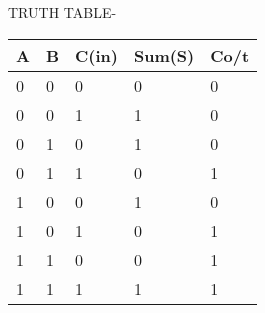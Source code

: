 \documentclass{article}
\begin{document}
TRUTH TABLE-
\begin{table}[truth table]
\begin{tabular}{|l|l|l|l|l|}
\hline
A & B & C(in) & Sum(S) & Co/t \\ \hline
0 & 0 & 0     & 0      & 0    \\
0 & 0 & 1     & 1      & 0    \\
0 & 1 & 0     & 1      & 0    \\ 
0 & 1 & 1     & 0      & 1    \\
1 & 0 & 0     & 1      & 0    \\
1 & 0 & 1     & 0      & 1    \\
1 & 1 & 0     & 0      & 1    \\
1 & 1 & 1     & 1      & 1    \\ \hline
\end{tabular}
\end{table}
\end{document}
